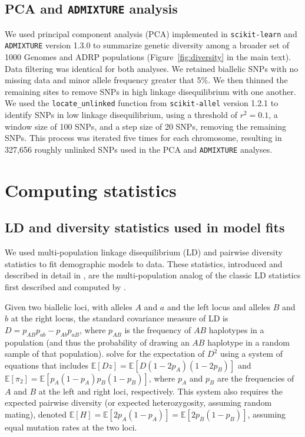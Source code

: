 \documentclass[]{article}
\newcommand{\E}{\mathbb{E}}
\begin{document}
\subsection{PCA and \texttt{ADMIXTURE} analysis}\label{sec:dimred}

We used principal component analysis (PCA) implemented in \texttt{scikit-learn}
\citep{Pedregosa2011-ke} and \texttt{ADMIXTURE} version 1.3.0
\citep{Alexander2011-aq} to summarize genetic diversity among a broader set of
1000 Genomes and ADRP populations (Figure~\ref{fig:diversity} in the main text). Data
filtering was identical for both analyses. We retained biallelic SNPs with no
missing data and minor allele frequency greater that 5\%. We then thinned the
remaining sites to remove SNPs in high linkage disequilibrium with one another.
We used the \texttt{locate\_unlinked} function from \texttt{scikit-allel}
version 1.2.1 \citep{Miles2021-yq} to identify SNPs in low linkage
disequilibrium, using a threshold of $r^2=0.1$, a window size of 100 SNPs, and
a step size of 20 SNPs, removing the remaining SNPs. This process was iterated
five times for each chromosome, resulting in 327,656 roughly unlinked SNPs used
in the PCA and \texttt{ADMIXTURE} analyses.

\section{Computing statistics}

\subsection{LD and diversity statistics used in model fits}
\label{sec:supp-ld-stats}

We used multi-population linkage disequilibrium (LD) and pairwise diversity
statistics to fit demographic models to data. These statistics, introduced and
described in detail in \citet{Ragsdale2019-nt}, are the multi-population analog
of the classic LD statistics first described and computed by
\citet{Hill1968-vu,Ohta1971-yd}.

Given two biallelic loci, with alleles $A$ and $a$ and the left locus and
alleles $B$ and $b$ at the right locus, the standard covariance measure of LD is
$D=p_{AB}p_{ab}-p_{Ab}p_{aB}$, where $p_{AB}$ is the frequency of $AB$
haplotypes in a population (and thus the probability of drawing an $AB$
haplotype in a random sample of that population). \citet{Hill1968-vu} solve for
the expectation of $D^2$ using a system of equations that includes $\E[Dz] =
\E[D(1-2p_A)(1-2p_B)]$ and $\E[\pi_2] = \E[p_A(1-p_A)p_B(1-p_B)]$, where $p_A$
and $p_B$ are the frequencies of $A$ and $B$ at the left and right loci,
respectively. This system also requires the expected pairwise diversity (or
expected heterozygosity, assuming random mating), denoted $\E[H] =
\E[2p_A(1-p_A)] = \E[2p_B(1-p_B)]$, assuming equal mutation rates at the two
loci.
\end{document}
